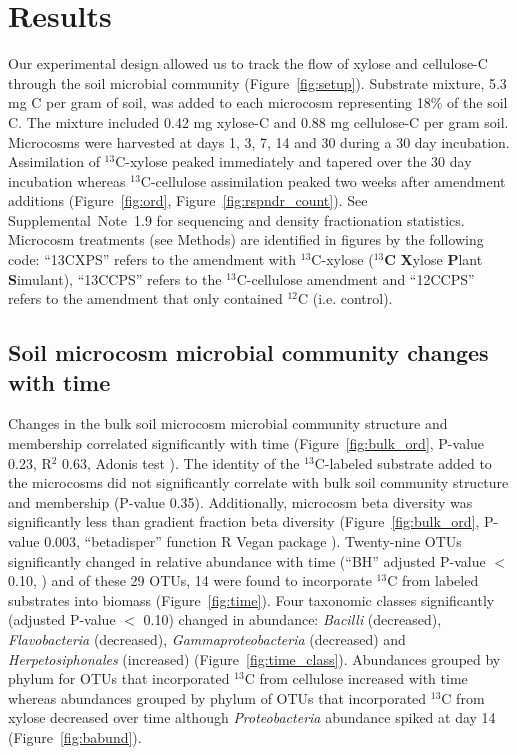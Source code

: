 \section{Results}
Our experimental design allowed us to track the flow of xylose and cellulose-C
through the soil microbial community (Figure~\ref{fig:setup}).
Substrate mixture, 5.3 mg C per gram of soil, was added to each microcosm
representing 18\% of the soil C. The mixture included 0.42 mg xylose-C and 0.88
mg cellulose-C per gram soil. Microcosms were harvested at days 1, 3, 7, 14 and
30 during a 30 day incubation. Assimilation of $^{13}$C-xylose peaked
immediately and tapered over the 30 day incubation whereas
$^{13}$C-cellulose assimilation peaked two weeks after amendment additions
(Figure~\ref{fig:ord}, Figure~\ref{fig:rspndr_count}). See
Supplemental~Note~1.9 for sequencing and density fractionation statistics.
Microcosm treatments (see Methods) are identified in figures by the
following code: ``13CXPS'' refers to the amendment with $^{13}$C-xylose
($^{13}$\textbf{C} \textbf{X}ylose \textbf{P}lant \textbf{S}imulant),
``13CCPS'' refers to the $^{13}$C-cellulose amendment and ``12CCPS'' refers
to the amendment that only contained $^{12}$C (i.e. control). 

\subsection{Soil microcosm microbial community changes with time}
Changes in the bulk soil microcosm microbial community structure and membership
correlated significantly with time (Figure~\ref{fig:bulk_ord},
P-value 0.23, R$^{2}$ 0.63, Adonis test \citep{Anderson2001a}). The identity of
the $^{13}$C-labeled substrate added to the microcosms did not significantly
correlate with bulk soil community structure and membership (P-value 0.35).
Additionally, microcosm beta diversity was significantly less than gradient
fraction beta diversity (Figure~\ref{fig:bulk_ord}, P-value 0.003,
``betadisper'' function R Vegan package \citep{Anderson2006,oksanen2007vegan}).
Twenty-nine OTUs significantly changed in relative abundance with time (``BH''
adjusted P-value $<$ 0.10, \citep{YBenjamini1995}) and of these 29 OTUs, 14
were found to incorporate $^{13}$C from labeled substrates into biomass
(Figure~\ref{fig:time}). Four taxonomic classes significantly (adjusted P-value
$<$ 0.10) changed in abundance: \textit{Bacilli} (decreased),
\textit{Flavobacteria} (decreased), \textit{Gammaproteobacteria} (decreased)
and \textit{Herpetosiphonales} (increased) (Figure~\ref{fig:time_class}).
Abundances grouped by phylum for OTUs that incorporated $^{13}$C from cellulose
increased with time whereas abundances grouped by phylum of OTUs that
incorporated $^{13}$C from xylose decreased over time although
\textit{Proteobacteria} abundance spiked at day 14 (Figure~\ref{fig:babund}).

